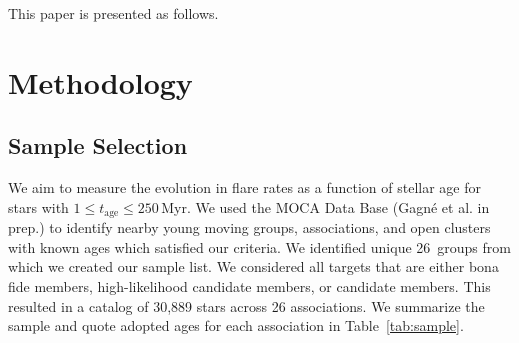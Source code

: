\documentclass[twocolumn]{aastex631}
\begin{document}
This paper is presented as follows.

\section{Methodology}
\label{sec:methods}

\subsection{Sample Selection}



We aim to measure the evolution in flare rates as a function of stellar age for
stars with $1 \leq t_\textrm{age} \leq 250$\,Myr. We used the MOCA Data Base
(Gagné et al. in prep.) to identify nearby young moving groups, associations,
and open clusters with known ages which satisfied our criteria. We identified
unique 26~groups from which we created our sample list. We considered all targets
that are either bona fide members, high-likelihood candidate members, or candidate members.
This resulted in a catalog of 30,889 stars across 26 associations. We summarize
the sample and quote adopted ages for each association
in Table~\ref{tab:sample}.
\end{document}
